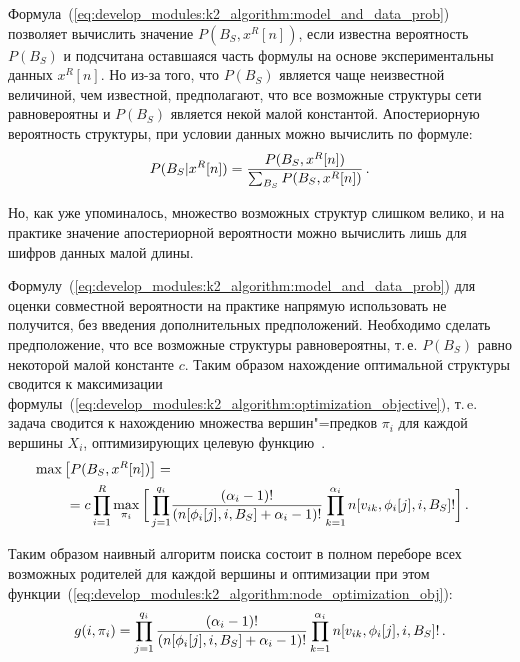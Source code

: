 Формула~(\ref{eq:develop_modules:k2_algorithm:model_and_data_prob}) позволяет вычислить значение $P(B_S, x^R[n])$, если известна вероятность $P(B_S)$ и подсчитана оставшаяся часть формулы на основе экспериментальны данных $x^R[n]$.
Но из-за того, что $P(B_S)$ является чаще неизвестной величиной, чем известной, предполагают, что все возможные структуры сети равновероятны и $P(B_S)$ является некой малой константой.
Апостериорную вероятность структуры, при условии данных можно вычислить по формуле:
\begin{equation}
  \label{eq:develop_modules:k2_algorithm:aposteriori_structure_given_data}
  P(B_S | x^R[n]) =
    \frac{P(B_S, x^R[n])}
         {\sum_{B_S}P(B_S, x^R[n])} \text{\,.}
\end{equation}

Но, как уже упоминалось, множество возможных структур слишком велико, и на практике значение апостериорной вероятности можно вычислить лишь для шифров данных малой длины.

Формулу~(\ref{eq:develop_modules:k2_algorithm:model_and_data_prob}) для оценки совместной вероятности на практике напрямую использовать не получится, без введения дополнительных предположений.
Необходимо сделать предположение, что все возможные структуры равновероятны, т.\,е. $P(B_S)$ равно некоторой малой константе $c$.
Таким образом нахождение оптимальной структуры сводится к максимизации формулы~(\ref{eq:develop_modules:k2_algorithm:optimization_objective}), т.\,e. задача сводится к нахождению множества вершин"=предков $ \pi_i $ для каждой вершины $X_i$, оптимизирующих целевую функцию~\cite{Cooper1991}.
\begin{align}
  \label{eq:develop_modules:k2_algorithm:optimization_objective}
  \max \left[ P(B_S, x^R[n]) \right] = \notag\\
  =
    c \prod_{i = 1}^{R} \max_{\pi_i}
    \bigg[
      \prod_{j = 1}^{q_i} &%
      \frac{(\alpha_i - 1)!}
           {(n[\phi_i[j], i, B_S] + \alpha_i - 1)!}
      \prod_{k = 1}^{\alpha_i}
        n[v_{ik}, \phi_i[j], i, B_S]!
    \bigg] \text{\,.}
\end{align}

Таким образом наивный алгоритм поиска состоит в полном переборе всех возможных родителей для каждой вершины и оптимизации при этом функции~(\ref{eq:develop_modules:k2_algorithm:node_optimization_obj}):
\begin{equation}
  \label{eq:develop_modules:k2_algorithm:node_optimization_obj}
  g(i, \pi_i) =
    \prod_{j = 1}^{q_i}
      \frac{(\alpha_i - 1)!}
           {(n[\phi_i[j], i, B_S] + \alpha_i - 1)!}
      \prod_{k = 1}^{\alpha_i}
        n[v_{ik}, \phi_i[j], i, B_S]! \text{\,.}
\end{equation}

